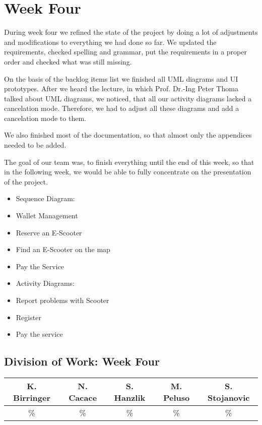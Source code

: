 \documentclass[a4paper, 12pt]{article}
\begin{document}
\section{Week Four}
During week four we refined the state of the project by doing a lot of adjustments and modifications to everything we had done so far.
We updated the requirements, checked spelling and grammar, put the requirements in a proper order and checked what was still missing.

On the basis of the backlog items list we finished all UML diagrams and UI prototypes.
After we heard the lecture, in which Prof. Dr.-Ing Peter Thoma talked about UML diagrams, we  noticed, that all our activity diagrams lacked a cancelation mode. Therefore, we had to adjust all these diagrams and add a cancelation mode to them. 

We also finished most of the documentation, so that almost only the appendices needed to be added.

The goal of our team was, to finish everything until the end of this week, so that in the following week, we would be able to fully concentrate on the presentation of the project.

\begin{itemize}
\item Sequence Diagram:
	\item Wallet Management
	\item Reserve an E-Scooter
	\item Find an E-Scooter on the map
	\item Pay the Service

\item Activity Diagrams:
	\item Report problems with Scooter
	\item Register
	\item Pay the service
\end{itemize}

\subsection{Division of Work: Week Four}

\begin{table}[h]
\centering
\setlength{\tabcolsep}{10pt}
\begin{tabular}{|c|c|c|c|c|}
\hline
K. Birringer & N. Cacace & S. Hanzlik & M. Peluso & S. Stojanovic\\
\hline
\% & \% & \% & \% & \% \\ 
\hline
\end{tabular}
\end{table}
\end{document}
